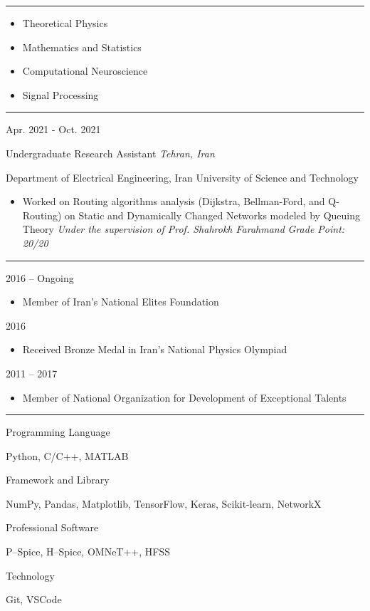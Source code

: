 \documentclass[a4paper,10pt]{article}
\newlength{\cvcolumngapwidth}
\newlength{\cvleftcolumnwidth}
\newlength{\cvrightcolumnwidth}
\newcommand{\cvsectionstyle}[1]{{\normalsize\cvsectionfont\textcolor{cvsectioncolor}{#1}}}
\newcommand{\cvtitlestyle}[1]{{\large\cvtitlefont\textcolor{cvtitlecolor}{#1}}}
\newcommand{\cvdurationstyle}[1]{{\small\cvdurationfont\textcolor{cvdurationcolor}{#1}}}
\newcommand{\cvheadingstyle}[1]{{\normalsize\cvheadingfont\textcolor{cvheadingcolor}{#1}}}
\newlength{\cvafteritemskipamount}
\newlength{\cvaftersectionskipamount}
\newlength{\cvbetweensectionandheadingextraskipamount}
\newlength{\cvaftertitleskipamount}
\newlength{\cvparskip}
\newcommand{\cvsection}[1]{
    \begin{minipage}[t]{\cvleftcolumnwidth}
        \raggedleft\cvsectionstyle{#1}
    \end{minipage}%
    \hspace{\cvcolumngapwidth}%
    \begin{minipage}[t]{\cvrightcolumnwidth}
        \textcolor{cvrulecolor}{\rule{\cvrightcolumnwidth}{0.3mm}}
    \end{minipage}

    \vspace{\cvaftersectionskipamount}
}
\newcommand{\cvitem}[2]{
    \begin{minipage}[t]{\cvleftcolumnwidth}
        \raggedleft #1
    \end{minipage}%
    \hspace{\cvcolumngapwidth}%
    \begin{minipage}[t]{\cvrightcolumnwidth}
        \setlength{\parskip}{\cvparskip} #2
    \end{minipage}

    \vspace{\cvafteritemskipamount}
}
\newcommand{\cvtitle}[1]{
    \cvtitlestyle{#1}

    \vspace{\cvaftertitleskipamount}
    \vspace{-\cvparskip}
}
\begin{document}
\cvsection{Research Interest}
\cvitem{\;}{
    \begin{itemize}[leftmargin=*]
        \item Theoretical Physics
        \item Mathematics and Statistics
        \item Computational Neuroscience
        \item Signal Processing
    \end{itemize}
}

\cvsection{Research Experience}
\cvitem{
    \cvdurationstyle{Apr. 2021 - Oct. 2021}
}{
    \cvtitle{{Undergraduate Research Assistant} \hfill{\textnormal{\textit{Tehran, Iran}}}}
    {Department of Electrical Engineering, Iran University of Science and Technology}
    \begin{itemize}[leftmargin=*]
        \item Worked on Routing algorithms analysis (Dijkstra, Bellman-Ford, and Q-Routing) on Static and
              Dynamically Changed Networks modeled by Queuing Theory
              \newline
              \textit{\small{Under the supervision of Prof. Shahrokh Farahmand}}
              \newline
              \textit{\small{Grade Point: 20/20}}
    \end{itemize}
}

\cvsection{Achievement}
\cvitem{
    \cvdurationstyle{2016 – Ongoing}
}{
    \begin{itemize}[leftmargin=*]
        \item Member of Iran’s National Elites Foundation
    \end{itemize}
}
\vspace{-4mm}
\cvitem{
    \cvdurationstyle{2016}
}{
    \begin{itemize}[leftmargin=*]
        \item Received Bronze Medal in Iran’s National Physics Olympiad
    \end{itemize}
}
\vspace{-4mm}
\cvitem{
    \cvdurationstyle{2011 – 2017}
}{
    \begin{itemize}[leftmargin=*]
        \item Member of National Organization for Development of Exceptional Talents
    \end{itemize}
}


\cvsection{Technical Skill}
\vspace{\cvbetweensectionandheadingextraskipamount}
\cvitem{
    \cvheadingstyle{Programming Language}
}{
    Python, C/C++, MATLAB
}
\vspace{-4mm}
\cvitem{
    \cvheadingstyle{Framework and Library}
}{
    NumPy, Pandas, Matplotlib, TensorFlow, Keras, Scikit-learn, NetworkX
}
\vspace{-4mm}
\cvitem{
    \cvheadingstyle{Professional Software}
}{
    P–Spice, H–Spice, OMNeT++, HFSS
}
\vspace{-4mm}
\cvitem{
    \cvheadingstyle{Technology}
}{
    Git, VSCode
}
\end{document}
